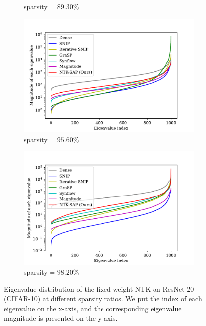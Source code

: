 \documentclass{article} %
\begin{document}
\begin{figure}
\begin{subfigure}[b]{.49\textwidth}
   \caption{\small sparsity = $89.30\%$}
   \label{fig:appendix-eig-init-10}
  \end{subfigure}
   \begin{subfigure}[b]{.49\textwidth}
        \includegraphics[width=\textwidth]{plots/nips_rebuttal/init/comparison14.0_finalfull.pdf}
   \caption{\small sparsity = $95.60\%$}
   \label{fig:appendix-eig-init-14}
  \end{subfigure}
    \begin{subfigure}[b]{.49\textwidth}
        \includegraphics[width=\textwidth]{plots/nips_rebuttal/init/comparison18.0_finalfull.pdf}
   \caption{\small sparsity = $98.20\%$}
   \label{fig:appendix-eig-init-18}
    \end{subfigure}
    \caption{Eigenvalue distribution of the fixed-weight-NTK on ResNet-20 (CIFAR-10) at different sparsity ratios. We put the index of each eigenvalue on the x-axis, and the corresponding eigenvalue magnitude is presented on the y-axis.
    }
    \label{fig:appendix-eig-init}
\end{figure}
\end{document}
